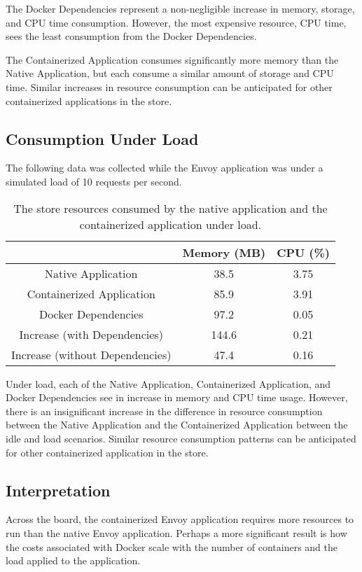 \documentclass{article}
\begin{document}
The Docker Dependencies represent a non-negligible increase in memory, storage, and CPU time consumption. However, the most expensive resource, CPU time, sees the least consumption from the Docker Dependencies.

The Containerized Application consumes significantly more memory than the Native Application, but each consume a similar amount of storage and CPU time. Similar increases in resource consumption can be anticipated for other containerized applications in the store.

\subsection{Consumption Under Load}
The following data was collected while the Envoy application was under a simulated load of 10 requests per second.

\begin{table}[H]
\begin{tabular}{ |c|c|c| }
 \hline
   & Memory (MB) & CPU (\%) \\ 
 \hline
 Native Application & 38.5 & 3.75 \\
 \hline
 Containerized Application & 85.9 & 3.91 \\
 \hline
 Docker Dependencies & 97.2 & 0.05 \\
 \hline\hline
 Increase (with Dependencies) & 144.6 & 0.21 \\
 \hline
 Increase (without Dependencies) & 47.4 & 0.16 \\
 \hline
\end{tabular}
\caption{The store resources consumed by the native application and the containerized application under load.}
\label{consumption-under-load}
\end{table}

Under load, each of the Native Application, Containerized Application, and Docker Dependencies see in increase in memory and CPU time usage. However, there is an insignificant increase in the difference in resource consumption between the Native Application and the Containerized Application between the idle and load scenarios. Similar resource consumption patterns can be anticipated for other containerized application in the store.

\subsection{Interpretation}
Across the board, the containerized Envoy application requires more resources to run than the native Envoy application. Perhaps a more significant result is how the costs associated with Docker scale with the number of containers and the load applied to the application.
\end{document}
